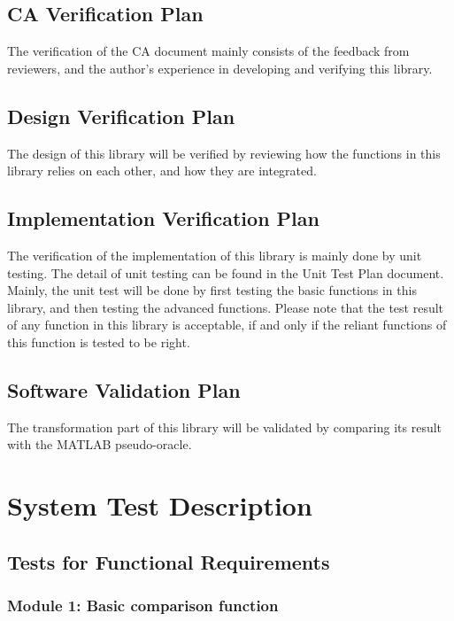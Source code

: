 \documentclass[12pt, titlepage]{article}
\begin{document}
\subsection{CA Verification Plan}

The verification of the CA document mainly consists of the feedback from reviewers, and the author's experience in developing and verifying this library. 


\subsection{Design Verification Plan}

The design of this library will be verified by reviewing how the functions in this library relies on each other, and how they are integrated.

\subsection{Implementation Verification Plan}

The verification of the implementation of this library is mainly done by unit testing. The detail of unit testing can be found in the Unit Test Plan document. Mainly, the unit test will be done by first testing the basic functions in this library, and then testing the advanced functions. Please note that the test result of any function in this library is acceptable, if and only if the reliant functions of this function is tested to be right.
  


\subsection{Software Validation Plan}

The transformation part of this library will be validated by comparing its result with the MATLAB pseudo-oracle.

\section{System Test Description}
	
\subsection{Tests for Functional Requirements}

\subsubsection{Module 1: Basic comparison function}
\end{document}
